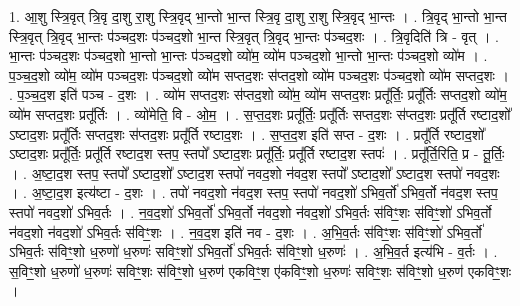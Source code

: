 \documentclass[17pt]{extarticle}
\begin{document}
1. आ॒शु स्त्रि॒वृत् त्रि॒वृ दा॒शु रा॒शु स्त्रि॒वृद् भा॒न्तो भा॒न्त स्त्रि॒वृ दा॒शु रा॒शु स्त्रि॒वृद् भा॒न्तः । . त्रि॒वृद् भा॒न्तो भा॒न्त स्त्रि॒वृत् त्रि॒वृद् भा॒न्तः प॑ञ्चद॒शः प॑ञ्चद॒शो भा॒न्त स्त्रि॒वृत् त्रि॒वृद् भा॒न्तः प॑ञ्चद॒शः । . त्रि॒वृदिति॑ त्रि - वृत् । . भा॒न्तः प॑ञ्चद॒शः प॑ञ्चद॒शो भा॒न्तो भा॒न्तः प॑ञ्चद॒शो व्यो॑म॒ व्यो॑म पञ्चद॒शो भा॒न्तो भा॒न्तः प॑ञ्चद॒शो व्यो॑म । . प॒ञ्च॒द॒शो व्यो॑म॒ व्यो॑म पञ्चद॒शः प॑ञ्चद॒शो व्यो॑म सप्तद॒शः स॑प्तद॒शो व्यो॑म पञ्चद॒शः प॑ञ्चद॒शो व्यो॑म सप्तद॒शः । . प॒ञ्च॒द॒श इति॑ पञ्च - द॒शः । . व्यो॑म सप्तद॒शः स॑प्तद॒शो व्यो॑म॒ व्यो॑म सप्तद॒शः प्रतू᳚र्तिः॒ प्रतू᳚र्तिः सप्तद॒शो व्यो॑म॒ व्यो॑म सप्तद॒शः प्रतू᳚र्तिः । . व्यो॑मेति॒ वि - ओ॒म॒ । . स॒प्त॒द॒शः प्रतू᳚र्तिः॒ प्रतू᳚र्तिः सप्तद॒शः स॑प्तद॒शः प्रतू᳚र्ति रष्टाद॒शो᳚ ऽष्टाद॒शः प्रतू᳚र्तिः सप्तद॒शः स॑प्तद॒शः प्रतू᳚र्ति रष्टाद॒शः । . स॒प्त॒द॒श इति॑ सप्त - द॒शः । . प्रतू᳚र्ति रष्टाद॒शो᳚ ऽष्टाद॒शः प्रतू᳚र्तिः॒ प्रतू᳚र्ति रष्टाद॒श स्तप॒ स्तपो᳚ ऽष्टाद॒शः प्रतू᳚र्तिः॒ प्रतू᳚र्ति रष्टाद॒श स्तपः॑ । . प्रतू᳚र्ति॒रिति॒ प्र - तू॒र्तिः॒ । . अ॒ष्टा॒द॒श स्तप॒ स्तपो᳚ ऽष्टाद॒शो᳚ ऽष्टाद॒श स्तपो॑ नवद॒शो न॑वद॒श स्तपो᳚ ऽष्टाद॒शो᳚ ऽष्टाद॒श स्तपो॑ नवद॒शः । . अ॒ष्टा॒द॒श इत्य॑ष्टा - द॒शः । . तपो॑ नवद॒शो न॑वद॒श स्तप॒ स्तपो॑ नवद॒शो॑ ऽभिव॒र्तो॑ ऽभिव॒र्तो न॑वद॒श स्तप॒ स्तपो॑ नवद॒शो॑ ऽभिव॒र्तः । . न॒व॒द॒शो॑ ऽभिव॒र्तो॑ ऽभिव॒र्तो न॑वद॒शो न॑वद॒शो॑ ऽभिव॒र्तः स॑विꣳ॒॒शः स॑विꣳ॒॒शो॑ ऽभिव॒र्तो न॑वद॒शो न॑वद॒शो॑ ऽभिव॒र्तः स॑विꣳ॒॒शः । . न॒व॒द॒श इति॑ नव - द॒शः । . अ॒भि॒व॒र्तः स॑विꣳ॒॒शः स॑विꣳ॒॒शो॑ ऽभिव॒र्तो॑ ऽभिव॒र्तः स॑विꣳ॒॒शो ध॒रुणो॑ ध॒रुणः॑ सविꣳ॒॒शो॑ ऽभिव॒र्तो॑ ऽभिव॒र्तः स॑विꣳ॒॒शो ध॒रुणः॑ । . अ॒भि॒व॒र्त इत्य॑भि - व॒र्तः । . स॒विꣳ॒॒शो ध॒रुणो॑ ध॒रुणः॑ सविꣳ॒॒शः स॑विꣳ॒॒शो ध॒रुण॑ एकविꣳ॒॒श ए॑कविꣳ॒॒शो ध॒रुणः॑ सविꣳ॒॒शः स॑विꣳ॒॒शो ध॒रुण॑ एकविꣳ॒॒शः । \newline
\end{document}
